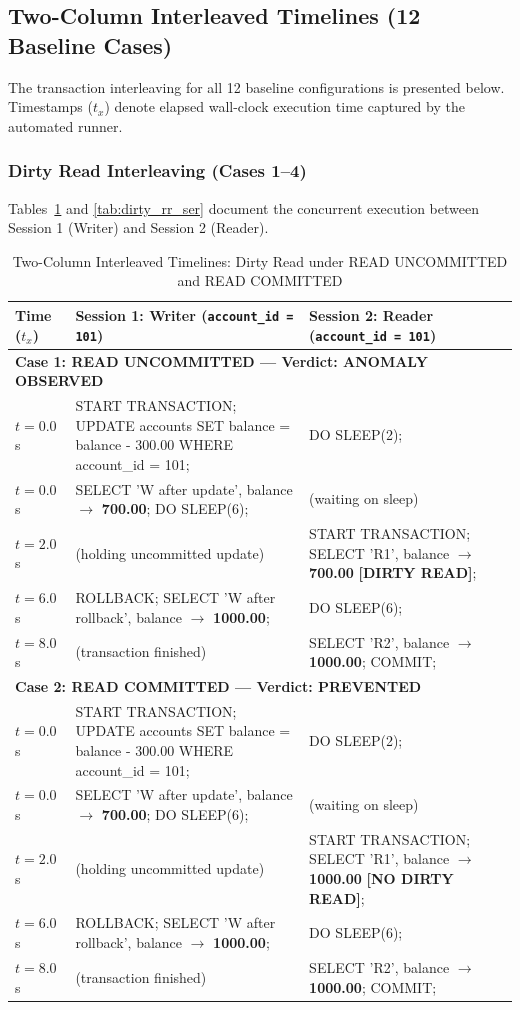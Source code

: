 \documentclass[sigconf, pbalance, nonacm]{acmart}
\begin{document}
\subsection{Two-Column Interleaved Timelines (12 Baseline Cases)}
The transaction interleaving for all 12 baseline configurations is presented below. Timestamps ($t_x$) denote elapsed wall-clock execution time captured by the automated runner.

\subsubsection{Dirty Read Interleaving (Cases 1--4)}
Tables~\ref{tab:dirty_ru_rc} and \ref{tab:dirty_rr_ser} document the concurrent execution between Session 1 (Writer) and Session 2 (Reader).

\begin{table}[t]
\centering
\small
\caption{Two-Column Interleaved Timelines: Dirty Read under READ UNCOMMITTED and READ COMMITTED}
\label{tab:dirty_ru_rc}
\begin{tabularx}{\textwidth}{p{1.8cm} X X}
\toprule
\textbf{Time ($t_x$)} & \textbf{Session 1: Writer (\texttt{account\_id = 101})} & \textbf{Session 2: Reader (\texttt{account\_id = 101})} \\
\midrule
\multicolumn{3}{l}{\textbf{Case 1: READ UNCOMMITTED --- Verdict: ANOMALY OBSERVED}} \\
$t = 0.0$s & START TRANSACTION; UPDATE accounts SET balance = balance - 300.00 WHERE account\_id = 101; & DO SLEEP(2); \\
$t = 0.0$s & SELECT 'W after update', balance $\rightarrow$ \textbf{700.00}; DO SLEEP(6); & (waiting on sleep) \\
$t = 2.0$s & (holding uncommitted update) & START TRANSACTION; SELECT 'R1', balance $\rightarrow$ \textbf{700.00} \textbf{[DIRTY READ]}; \\
$t = 6.0$s & ROLLBACK; SELECT 'W after rollback', balance $\rightarrow$ \textbf{1000.00}; & DO SLEEP(6); \\
$t = 8.0$s & (transaction finished) & SELECT 'R2', balance $\rightarrow$ \textbf{1000.00}; COMMIT; \\
\midrule
\multicolumn{3}{l}{\textbf{Case 2: READ COMMITTED --- Verdict: PREVENTED}} \\
$t = 0.0$s & START TRANSACTION; UPDATE accounts SET balance = balance - 300.00 WHERE account\_id = 101; & DO SLEEP(2); \\
$t = 0.0$s & SELECT 'W after update', balance $\rightarrow$ \textbf{700.00}; DO SLEEP(6); & (waiting on sleep) \\
$t = 2.0$s & (holding uncommitted update) & START TRANSACTION; SELECT 'R1', balance $\rightarrow$ \textbf{1000.00} \textbf{[NO DIRTY READ]}; \\
$t = 6.0$s & ROLLBACK; SELECT 'W after rollback', balance $\rightarrow$ \textbf{1000.00}; & DO SLEEP(6); \\
$t = 8.0$s & (transaction finished) & SELECT 'R2', balance $\rightarrow$ \textbf{1000.00}; COMMIT; \\
\bottomrule
\end{tabularx}
\end{table}
\end{document}
